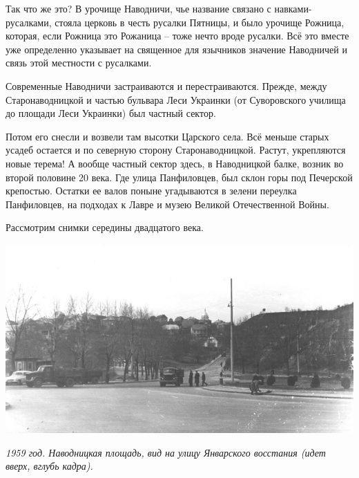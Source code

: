 Так что же это? В урочище Наводничи, чье название связано с навками-русалками, стояла церковь в честь русалки Пятницы, и было урочище Рожница, которая, если Рожница это Рожаница – тоже нечто вроде русалки. Всё это вместе уже определенно указывает на священное для язычников значение Наводничей и связь этой местности с русалками.





Современные Наводничи застраиваются и перестраиваются. Прежде, между Старонаводницкой и частью бульвара Леси Украинки (от Суворовского училища до площади Леси Украинки) был частный сектор.

Потом его снесли и возвели там высотки Царского села. Всё меньше старых усадеб остается и по северную сторону Старонаводницкой. Растут, укрепляются новые терема! А вообще частный сектор здесь, в Наводницкой балке, возник во второй половине 20 века. Где улица Панфиловцев, был склон горы под Печерской крепостью. Остатки ее валов поныне угадываются в зелени переулка Панфиловцев, на подходах к Лавре и музею Великой Отечественной Войны.

Рассмотрим снимки середины двадцатого века.

\begin{center}
\includegraphics[width=\linewidth]{chast-vosp/zver/1959-navodnic-01.jpg}

\textit{1959 год. Наводницкая площадь, вид на улицу Январского восстания (идет вверх, вглубь кадра).}
\end{center}

